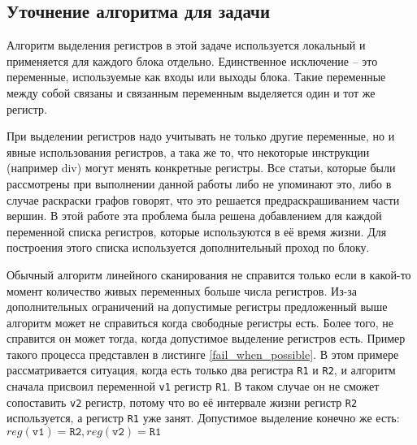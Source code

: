 \documentclass[a4paper,14pt]{extarticle}
\begin{document}

\subsection{Уточнение алгоритма для задачи}

Алгоритм выделения регистров в этой задаче используется локальный и применяется для каждого блока отдельно.
Единственное исключение -- это переменные, используемые как входы или выходы блока.
Такие переменные между собой связаны и связанным переменным выделяется один и тот же регистр.

При выделении регистров надо учитывать не только другие переменные, но и явные использования регистров, а така же то, что некоторые инструкции (например div) могут менять конкретные регистры.
Все статьи, которые были рассмотрены при выполнении данной работы либо не упоминают это, либо в случае раскраски графов говорят, что это решается предраскрашиванием части вершин.
В этой работе эта проблема была решена добавлением для каждой переменной списка регистров, которые используются в её время жизни.
Для построения этого списка используется дополнительный проход по блоку.

Обычный алгоритм линейного сканирования не справится только если в какой-то момент количество живых переменных больше числа регистров.
Из-за дополнительных ограничений на допустимые регистры предложенный выше алгоритм может не справиться когда свободные регистры есть.
Более того, не справится он может тогда, когда допустимое выделение регистров есть.
Пример такого процесса представлен в листинге \ref{fail_when_possible}.
В этом примере рассматривается ситуация, когда есть только два регистра \texttt{R1} и \texttt{R2}, и алгоритм сначала присвоил переменной \texttt{v1} регистр \texttt{R1}.
В таком случае он не сможет сопоставить \texttt{v2} регистр, потому что во её интервале жизни регистр \texttt{R2} используется, а регистр \texttt{R1} уже занят.
Допустимое выделение конечно же есть: $reg(\texttt{v1}) = \texttt{R2}, reg(\texttt{v2}) = \texttt{R1}$
\end{document}
